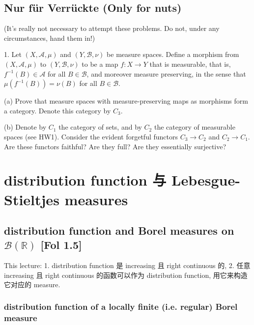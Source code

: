 \documentclass{qlnotes-export}
\begin{document}
\section{Nur für Verrückte (Only for nuts)}\label{nur-fuxfcr-verruxfcckte-only-for-nuts}

(It's really not necessary to attempt these problems. Do not, under any circumstances, hand them in!)

1. Let \((X,\mathcal{A},\mu)\) and \((Y,\mathcal{B},\nu)\) be measure spaces. Define a morphism from \((X,\mathcal{A},\mu)\) to \((Y,\mathcal{B},\nu)\) to be a map \(f:X\rightarrow Y\) that is measurable, that is, \(f^{- 1}(B) \in \mathcal{A}\) for all \(B \in \mathcal{B}\), and moreover measure preserving, in the sense that \(\mu(f^{- 1}(B)) = \nu(B)\) for all \(B \in \mathcal{B}\).

(a) Prove that measure spaces with measure-preserving maps as morphisms form a category. Denote this category by \(C_{3}\).

(b) Denote by \(C_{1}\) the category of sets, and by \(C_{2}\) the category of measurable spaces (see HW1). Consider the evident forgetful functors \(C_{3}\rightarrow C_{2}\) and \(C_{2}\rightarrow C_{1}\). Are these functors faithful? Are they full? Are they essentially surjective?

\chapter{distribution function 与 Lebesgue-Stieltjes measures}\label{distribution-function-ux4e0e-lebesgue-stieltjes-measures}

\section{\texorpdfstring{distribution function and Borel measures on \(\mathcal{B}({\mathbb{R}})\) {[}Fol 1.5{]}}{distribution function and Borel measures on \textbackslash mathcal\{B\}(\{\textbackslash mathbb\{R\}\}) {[}Fol 1.5{]}}}

This lecture: 1. distribution function 是 increasing 且 right continuous 的, 2. 任意 increasing 且 right continuous 的函数可以作为 distribution function, 用它来构造它对应的 measure.

\subsection{distribution function of a locally finite (i.e. regular) Borel measure}\label{distribution-function-of-a-locally-finite-i.e.-regular-borel-measure}
\end{document}
